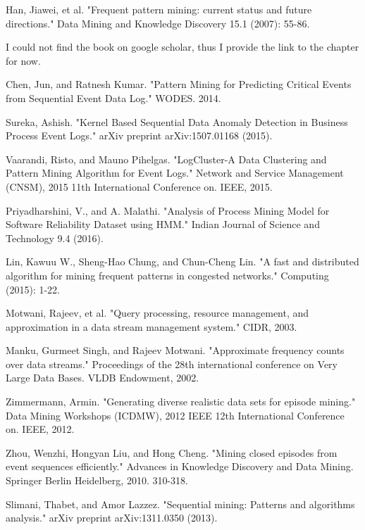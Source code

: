\begin{thebibliography}{1}

Han, Jiawei, et al. "Frequent pattern mining: current status and future directions." Data Mining and Knowledge Discovery 15.1 (2007): 55-86.

I could not find the book on google scholar, thus I provide the link to the chapter for now.

Chen, Jun, and Ratnesh Kumar. "Pattern Mining for Predicting Critical Events from Sequential Event Data Log." WODES. 2014.

Sureka, Ashish. "Kernel Based Sequential Data Anomaly Detection in Business Process Event Logs." arXiv preprint arXiv:1507.01168 (2015).

Vaarandi, Risto, and Mauno Pihelgas. "LogCluster-A Data Clustering and Pattern Mining Algorithm for Event Logs." Network and Service Management (CNSM), 2015 11th International Conference on. IEEE, 2015.

Priyadharshini, V., and A. Malathi. "Analysis of Process Mining Model for Software Reliability Dataset using HMM." Indian Journal of Science and Technology 9.4 (2016).

Lin, Kawuu W., Sheng-Hao Chung, and Chun-Cheng Lin. "A fast and distributed algorithm for mining frequent patterns in congested networks." Computing (2015): 1-22.

Motwani, Rajeev, et al. "Query processing, resource management, and approximation in a data stream management system." CIDR, 2003.

Manku, Gurmeet Singh, and Rajeev Motwani. "Approximate frequency counts over data streams." Proceedings of the 28th international conference on Very Large Data Bases. VLDB Endowment, 2002.

Zimmermann, Armin. "Generating diverse realistic data sets for episode mining." Data Mining Workshops (ICDMW), 2012 IEEE 12th International Conference on. IEEE, 2012.

Zhou, Wenzhi, Hongyan Liu, and Hong Cheng. "Mining closed episodes from event sequences efficiently." Advances in Knowledge Discovery and Data Mining. Springer Berlin Heidelberg, 2010. 310-318.

Slimani, Thabet, and Amor Lazzez. "Sequential mining: Patterns and algorithms analysis." arXiv preprint arXiv:1311.0350 (2013).


\end{thebibliography}
